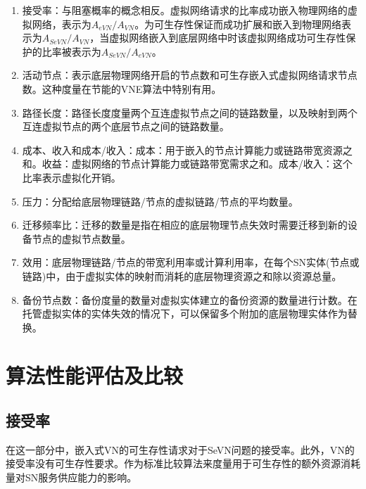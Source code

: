 \begin{enumerate}
  \item 接受率：与阻塞概率的概念相反。虚拟网络请求的比率成功嵌入物理网络的虚拟网络，表示为$A_{eVN}/A_{VN}$。为可生存性保证而成功扩展和嵌入到物理网络表示为$A_{SeVN}/A_{VN}$，当虚拟网络嵌入到底层网络中时该虚拟网络成功可生存性保护的比率被表示为$A_{SeVN}/A_{eVN}$。
  \item 活动节点：表示底层物理网络开启的节点数和可生存嵌入式虚拟网络请求节点数。这种度量在节能的VNE算法中特别有用。
  \item 路径长度：路径长度度量两个互连虚拟节点之间的链路数量，以及映射到两个互连虚拟节点的两个底层节点之间的链路数量。
  \item 成本、收入和成本/收入：成本：用于嵌入的节点计算能力或链路带宽资源之和。收益：虚拟网络的节点计算能力或链路带宽需求之和。成本/收入：这个比率表示虚拟化开销。
  \item 压力：分配给底层物理链路/节点的虚拟链路/节点的平均数量。
  \item 迁移频率比：迁移的数量是指在相应的底层物理节点失效时需要迁移到新的设备节点的虚拟节点数量。
  \item 效用：底层物理链路/节点的带宽利用率或计算利用率，在每个SN实体(节点或链路)中，由于虚拟实体的映射而消耗的底层物理资源之和除以资源总量。
  \item 备份节点数：备份度量的数量对虚拟实体建立的备份资源的数量进行计数。在托管虚拟实体的实体失效的情况下，可以保留多个附加的底层物理实体作为替换。
\end{enumerate}
\section{算法性能评估及比较}
\subsection{接受率}
在这一部分中，嵌入式VN的可生存性请求对于SeVN问题的接受率。此外，VN的接受率没有可生存性要求。作为标准比较算法来度量用于可生存性的额外资源消耗量对SN服务供应能力的影响。

